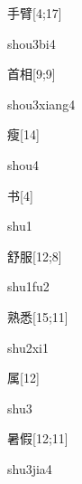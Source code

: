\begin{verbete}[shou3bi4]{手臂}[4;17]
\begin{pronuncia}{shou3bi4}
\end{pronuncia}
\end{verbete}

\begin{verbete}{首相}[9;9]
\begin{pronuncia}{shou3xiang4}
\end{pronuncia}
\end{verbete}

\begin{verbete}[shou4]{瘦}[14]
\begin{pronuncia}{shou4}
\end{pronuncia}
\end{verbete}

\begin{verbete}[shu1]{书}[4]
\begin{pronuncia}{shu1}
\end{pronuncia}
\end{verbete}

\begin{verbete}[shu1fu2]{舒服}[12;8]
\begin{pronuncia}{shu1fu2}
\end{pronuncia}
\end{verbete}

\begin{verbete}[shu2xi1]{熟悉}[15;11]
\begin{pronuncia}{shu2xi1}
\end{pronuncia}
\end{verbete}

\begin{verbete}[shu3]{属}[12]
\begin{pronuncia}{shu3}
\end{pronuncia}
\end{verbete}

\begin{verbete}{暑假}[12;11]
\begin{pronuncia}{shu3jia4}
\end{pronuncia}
\end{verbete}

